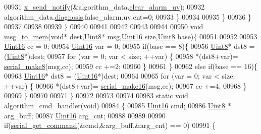 \begin{DoxyCode}
{{{{{00931               \hyperlink{a00036_ae17b0bb16da3c471bb6074bb4c4d0fee}{x\_send\_notify}(&algorithm\_data.\hyperlink{a00016_a5d8e57dd19de326e75625a8704cfceee}{clear\_alarm\_uv});
00932               algorithm\_data.\hyperlink{a00016_a16f85d57ec98b4ad05f5a2e10536b3c6}{diagnosis}.false\_alarm.uv.cnt=0;
00933               \}
00934 
00935             \}
00936         \}
00937 
00938        
00939 \}
00940 
00941 
00942 
00943        
00944 
\hypertarget{a00038_source_l00950}{}\hyperlink{a00038_a126f3d78a95341a19a3e862e57357952}{00950} \textcolor{keywordtype}{void} \hyperlink{a00038_a126f3d78a95341a19a3e862e57357952}{msg\_to\_mem}(\textcolor{keywordtype}{void}* dest,\hyperlink{a00072_af84840501dec18061d18a68c162a8fa2}{Uint8}* msg,\hyperlink{a00072_a59a9f6be4562c327cbfb4f7e8e18f08b}{Uint16} size,\hyperlink{a00072_af84840501dec18061d18a68c162a8fa2}{Uint8} base)\{
00951 
00952  
00953         \hyperlink{a00072_a59a9f6be4562c327cbfb4f7e8e18f08b}{Uint16} cc   = 0;
00954         \hyperlink{a00072_a59a9f6be4562c327cbfb4f7e8e18f08b}{Uint16} var  = 0;
00955         \textcolor{keywordflow}{if}(base == 8)\{
00956         \hyperlink{a00072_af84840501dec18061d18a68c162a8fa2}{Uint8}* dst8 = (\hyperlink{a00072_af84840501dec18061d18a68c162a8fa2}{Uint8}*)dest;
00957         \textcolor{keywordflow}{for} (var = 0; var < size; ++var) \{         
00958             *(dst8+var)= \hyperlink{a00031_aa76f5237babd71f1484bb2dbc6aa0f8d}{serial\_make8}(msg,cc);
00959             cc +=2;
00960         \}
00961         \}
00962         \textcolor{keywordflow}{else} \textcolor{keywordflow}{if}(base == 16)\{
00963         \hyperlink{a00072_a59a9f6be4562c327cbfb4f7e8e18f08b}{Uint16}* dst8 = (\hyperlink{a00072_a59a9f6be4562c327cbfb4f7e8e18f08b}{Uint16}*)dest;    
00964             
00965         \textcolor{keywordflow}{for} (var = 0; var < size; ++var) \{         
00966             *(dst8+var)= \hyperlink{a00031_abc17de32f14103a5be219df0d4ad9176}{serial\_make16}(msg,cc);
00967             cc +=4;
00968         \}
00969         \}
00970 
00971 \}
00972 
00973 
00974 
00983 \textcolor{keyword}{static} \textcolor{keywordtype}{void} algorithm\_cmd\_handler(\textcolor{keywordtype}{void})
00984 \{
00985     \hyperlink{a00072_a59a9f6be4562c327cbfb4f7e8e18f08b}{Uint16} cmd;
00986     \hyperlink{a00072_af84840501dec18061d18a68c162a8fa2}{Uint8} * arg\_buff;
00987     \hyperlink{a00072_a59a9f6be4562c327cbfb4f7e8e18f08b}{Uint16}  arg\_cnt;
00988 
00989 
00990     \textcolor{keywordflow}{if}(\hyperlink{a00031_a366b2707f4c7d76f0efc1b5cdde8e37e}{serial\_get\_command}(&cmd,&arg\_buff,&arg\_cnt) == 0)
00991     \{
}}}}}
\end{DoxyCode}

